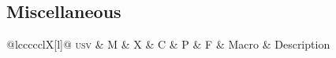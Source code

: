 \documentclass[final]{article}
\makeatletter
\def\cmd#1{\texttt{\textbackslash\expandafter\@gobble\string#1}}
\newcounter{#1}
\def\INPUT{}
\def\TABLE{%
  \par\noindent
  \begin{longtabu}[l]{@{}lccccclX[l]@{}}
    \toprule
    \textsc{usv} & M & X & C & P & F & Macro & Description \\
    \midrule \endhead
    \INPUT\\
    \bottomrule
  \end{longtabu}
}
\def\USV#1{\footnotesize\scshape\MakeLowercase{u+\@gobble#1}}
\def\CMD#1{\footnotesize\cmd#1}
\def\DESC#1{%
  \begin{spacing}{0.5}
    \RaggedRight\scriptsize #1%
  \end{spacing}
}
\def\PRINTLINE#1#2#3{
    \def\tempa{
      \USV{#1} &
      \SYMB{#2}{lm}{#1} &
      \SYMB{#2}{xits}{#1} &
      \SYMB{#2}{cambria}{#1} &
      \SYMB{#2}{pagella}{#1} &
      \SYMB{#2}{fira}{#1} &
      \CMD{#2}
      \tl_if_in:NnT \PLAIN {#2}
        {
          \makebox[0pt][l]
            { \color[gray]{0.7} \textsuperscript{\sffamily (p)} }
        }
      \tl_if_in:NnT \LTXSYM {#2}
        {
          \makebox[0pt][l]
            { \color[gray]{0.7} \textsuperscript{\sffamily (l)} }
        }
      \tl_if_in:NnT \AMSSYMB {#2}
        {
          \makebox[0pt][l]
            { \color[gray]{0.7} \textsuperscript{\sffamily (a)} }
        }
      &
      \DESC{#3} \\
    }%
    \expandafter\tempa
}
\def\SYMB#1#2#3{%
  \expandafter\iffontchar\csname#2\endcsname #3\relax
    \refstepcounter{#2}%
    \mathversion{#2}%
    $\displaystyle#1$%
  \fi
}
\def\PLAIN{\alpha\beta\gamma\delta\epsilon\zeta\eta\theta\iota\kappa\lambda\mu\nu\xi\pi\rho\sigma\tau\upsilon\phi\chi\psi\omega\varepsilon\vartheta\varpi\varrho\varsigma\varphi\Gamma\Delta\Theta\Lambda\Xi\Pi\Sigma\Upsilon\Phi\Psi\Omega
%
\aleph\hbar\imath\jmath\ell\wp\Re\Im\partial\infty\prime\emptyset\nabla\surd\top\bot\angle\triangle\forall\exists\neg\flat\natural\sharp\clubsuit\diamondsuit\heartsuit\spadesuit
%
\coprod\bigvee\bigwedge\biguplus\bigcap\bigcup\int\prod\sum\bigotimes\bigoplus\bigodot\oint\bigsqcup\smallint
%
\triangleleft\triangleright\bigtriangleup\bigtriangledown\wedge\land\vee\lor\cap\cup\ddagger\dagger\sqcap\sqcup\uplus\amalg\diamond\bullet\wr\div\odot\oslash\otimes\ominus\oplus\mp\pm\circ\bigcirc\setminus\cdot\ast\times\star\propto\sqsubseteq\sqsupseteq\parallel\mid\dashv\vdash\nearrow\searrow\nwarrow\swarrow\Leftrightarrow\Leftarrow\Rightarrow\neq\ne\lnot\leq\le\geq\ge\succ\prec\approx\succeq\preceq\supset\subset\supseteq\subseteq\in\ni\owns\gg\ll\not\leftrightarrow\leftarrow\gets\rightarrow\to\mapstochar\mapsto\sim\simeq\perp\equiv\asymp\smile\frown\leftharpoonup\leftharpoondown\rightharpoonup\rightharpoondown
%
\joinrel\relbar\Relbar\lhook\hookrightarrow\rhook\hookleftarrow\bowtie\models\Longrightarrow\longrightarrow\longleftarrow\Longleftarrow\longmapsto\longleftrightarrow\Longleftrightarrow\iff
%
\ldotp\cdotp\colon\ldots\cdots\vdots\ddots
%
\acute\grave\ddot\tilde\bar\breve\check\hat\vec\dot\widetilde\widehat
%
\overrightarrow\overleftarrow\overbrace\underbrace\lmoustache\rmoustache\lgroup\rgroup\arrowvert\Arrowvert\bracevert\Vert\vert\uparrow\downarrow\updownarrow\Uparrow\Downarrow\Updownarrow\backslash\rangle\langle\rbrace\lbrace\rceil\lceil\rfloor\lfloor\sqrt}
\def\LTXSYM{
\cong
\notin
\rightleftharpoons
\doteq
\mathring
}
\def\AMSSYMB{\boxdot\boxplus\boxtimes\square\blacksquare\centerdot\lozenge\blacklozenge\circlearrowright\circlearrowleft\leftrightharpoons\boxminus\Vdash\Vvdash\vDash\twoheadrightarrow\twoheadleftarrow\leftleftarrows\rightrightarrows\upuparrows\downdownarrows\upharpoonright\restriction\downharpoonright\upharpoonleft\downharpoonleft\rightarrowtail\leftarrowtail\leftrightarrows\rightleftarrows\Lsh\Rsh\rightsquigarrow\leftrightsquigarrow\looparrowleft\looparrowright\circeq\succsim\gtrsim\gtrapprox\multimap\therefore\because\doteqdot\Doteq\triangleq\precsim\lesssim\lessapprox\eqslantless\eqslantgtr\curlyeqprec\curlyeqsucc\preccurlyeq\leqq\leqslant\lessgtr\backprime\risingdotseq\fallingdotseq\succcurlyeq\geqq\geqslant\gtrless\vartriangleright\vartriangleleft\trianglerighteq\trianglelefteq\bigstar\between\blacktriangledown\blacktriangleright\blacktriangleleft\vartriangle\blacktriangle\triangledown\eqcirc\lesseqgtr\gtreqless\lesseqqgtr\gtreqqless\Rrightarrow\Lleftarrow\veebar\barwedge\doublebarwedge\measuredangle\sphericalangle\varpropto\smallsmile\smallfrown\Subset\Supset\Cup\doublecup\Cap\doublecap\curlywedge\curlyvee\leftthreetimes\rightthreetimes\subseteqq\supseteqq\bumpeq\Bumpeq\lll\llless\ggg\gggtr\circledS\pitchfork\dotplus\backsim\backsimeq\complement\intercal\circledcirc\circledast\circleddash\lvertneqq\gvertneqq\nleq\ngeq\nless\ngtr\nprec\nsucc\lneqq\gneqq\nleqslant\ngeqslant\lneq\gneq\npreceq\nsucceq\precnsim\succnsim\lnsim\gnsim\nleqq\ngeqq\precneqq\succneqq\precnapprox\succnapprox\lnapprox\gnapprox\nsim\ncong\diagup\diagdown\varsubsetneq\varsupsetneq\nsubseteqq\nsupseteqq\subsetneqq\supsetneqq\varsubsetneqq\varsupsetneqq\subsetneq\supsetneq\nsubseteq\nsupseteq\nparallel\nmid\nshortmid\nshortparallel\nvdash\nVdash\nvDash\nVDash\ntrianglerighteq\ntrianglelefteq\ntriangleleft\ntriangleright\nleftarrow\nrightarrow\nLeftarrow\nRightarrow\nLeftrightarrow\nleftrightarrow\divideontimes\varnothing\nexists\Finv\Game\eth\eqsim\beth\gimel\daleth\lessdot\gtrdot\ltimes\rtimes\shortmid\shortparallel\smallsetminus\thicksim\thickapprox\approxeq\succapprox\precapprox\curvearrowleft\curvearrowright\digamma\varkappa\Bbbk\hslash\backepsilon}
\makeatother
\begin{document}
\subsection{Miscellaneous}
\def\UnicodeMathSymbol#1#2#3#4{\PRINTLINE{#1}{#2}{#4}}
\TABLE

\label{count:lm}
\label{count:xits}
\label{count:cambria}
\label{count:pagella}
\label{count:fira}
\end{document}
